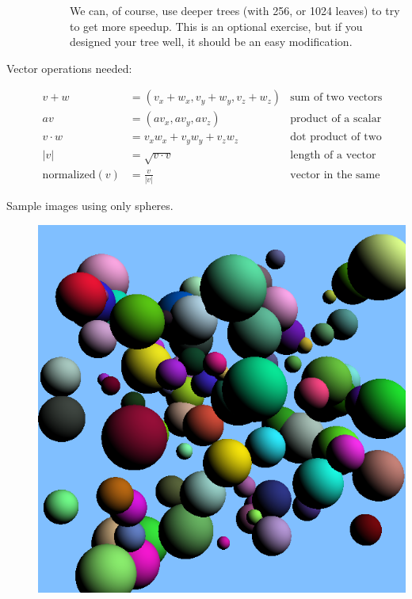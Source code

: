 \documentclass{article}
\begin{document}
\begin{description}
\begin{description}
  We can, of course, use deeper trees (with 256, or 1024 leaves) to
  try to get more speedup.  This is an optional exercise, but if you
  designed your tree well, it should be an easy modification.

\end{description}


\item[Vector operations needed:]
  \begin{align*}
    v + w &= (v_x+w_x, v_y+w_y, v_z+w_z) &\mbox{sum of two vectors}\\
    av &= (av_x, av_y, av_z) & \mbox{product of a scalar and a
      vector}\\
    v \cdot w &= v_xw_x + v_yw_y + v_zw_z &\mbox{dot product of two
      vectors}\\
    |v| &= \sqrt{v\cdot v} &\mbox{length of a vector}\\
    \mbox{normalized}(v) &= \frac{v}{|v|} &\mbox{vector in the same
      direction with unit length}
    \end{align*}


\item[Sample images using only spheres.]\mbox{}

\begin{center}
      {\includegraphics[scale=0.5]{randomspheres.png}}


\end{center}
\end{description}
\end{document}
